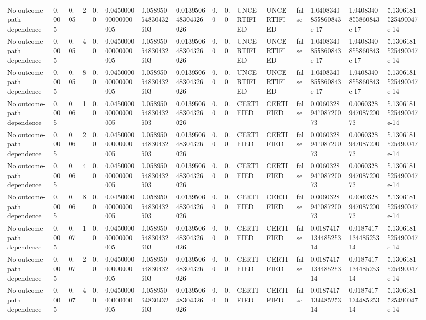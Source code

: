 \begin{tabular}{llllllllllllllll}
No outcome-path dependence & 0.005 & 0.05 & 2 & 0.0 & 0.045000000000000005 & 0.05895064830432603 & 0.013950648304326026 & 0.0 & 0.0 & UNCERTIFIED & UNCERTIFIED & false & 1.0408340855860843e-17 & 1.0408340855860843e-17 & 5.1306181525490047e-14 \\
No outcome-path dependence & 0.005 & 0.05 & 4 & 0.0 & 0.045000000000000005 & 0.05895064830432603 & 0.013950648304326026 & 0.0 & 0.0 & UNCERTIFIED & UNCERTIFIED & false & 1.0408340855860843e-17 & 1.0408340855860843e-17 & 5.1306181525490047e-14 \\
No outcome-path dependence & 0.005 & 0.05 & 8 & 0.0 & 0.045000000000000005 & 0.05895064830432603 & 0.013950648304326026 & 0.0 & 0.0 & UNCERTIFIED & UNCERTIFIED & false & 1.0408340855860843e-17 & 1.0408340855860843e-17 & 5.1306181525490047e-14 \\
No outcome-path dependence & 0.005 & 0.06 & 1 & 0.0 & 0.045000000000000005 & 0.05895064830432603 & 0.013950648304326026 & 0.0 & 0.0 & CERTIFIED & CERTIFIED & false & 0.006032894708720073 & 0.006032894708720073 & 5.1306181525490047e-14 \\
No outcome-path dependence & 0.005 & 0.06 & 2 & 0.0 & 0.045000000000000005 & 0.05895064830432603 & 0.013950648304326026 & 0.0 & 0.0 & CERTIFIED & CERTIFIED & false & 0.006032894708720073 & 0.006032894708720073 & 5.1306181525490047e-14 \\
No outcome-path dependence & 0.005 & 0.06 & 4 & 0.0 & 0.045000000000000005 & 0.05895064830432603 & 0.013950648304326026 & 0.0 & 0.0 & CERTIFIED & CERTIFIED & false & 0.006032894708720073 & 0.006032894708720073 & 5.1306181525490047e-14 \\
No outcome-path dependence & 0.005 & 0.06 & 8 & 0.0 & 0.045000000000000005 & 0.05895064830432603 & 0.013950648304326026 & 0.0 & 0.0 & CERTIFIED & CERTIFIED & false & 0.006032894708720073 & 0.006032894708720073 & 5.1306181525490047e-14 \\
No outcome-path dependence & 0.005 & 0.07 & 1 & 0.0 & 0.045000000000000005 & 0.05895064830432603 & 0.013950648304326026 & 0.0 & 0.0 & CERTIFIED & CERTIFIED & false & 0.018741713448525314 & 0.018741713448525314 & 5.1306181525490047e-14 \\
No outcome-path dependence & 0.005 & 0.07 & 2 & 0.0 & 0.045000000000000005 & 0.05895064830432603 & 0.013950648304326026 & 0.0 & 0.0 & CERTIFIED & CERTIFIED & false & 0.018741713448525314 & 0.018741713448525314 & 5.1306181525490047e-14 \\
No outcome-path dependence & 0.005 & 0.07 & 4 & 0.0 & 0.045000000000000005 & 0.05895064830432603 & 0.013950648304326026 & 0.0 & 0.0 & CERTIFIED & CERTIFIED & false & 0.018741713448525314 & 0.018741713448525314 & 5.1306181525490047e-14 \\

\end{tabular}
